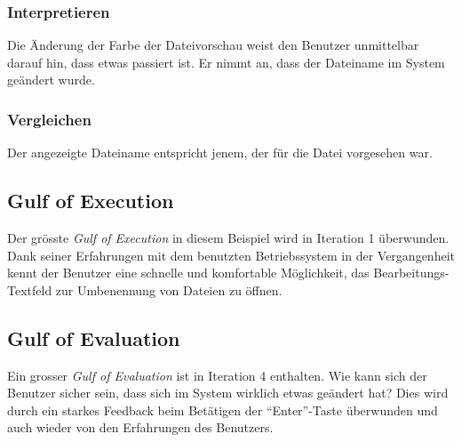 \subsubsection*{Interpretieren}
Die Änderung der Farbe der Dateivorschau weist den Benutzer unmittelbar darauf hin, dass etwas passiert ist. Er nimmt an, dass der Dateiname im System geändert wurde.
\subsubsection*{Vergleichen}
Der angezeigte Dateiname entspricht jenem, der für die Datei vorgesehen war.

\subsection*{Gulf of Execution}
Der grösste \textit{Gulf of Execution} in diesem Beispiel wird in Iteration 1 überwunden. 
Dank seiner Erfahrungen mit dem benutzten Betriebssystem in der Vergangenheit kennt der Benutzer eine schnelle und komfortable Möglichkeit, 
das Bearbeitungs-Textfeld zur Umbenennung von Dateien zu öffnen.

\subsection*{Gulf of Evaluation}
Ein grosser \textit{Gulf of Evaluation} ist in Iteration 4 enthalten. 
Wie kann sich der Benutzer sicher sein, dass sich im System wirklich etwas geändert hat? 
Dies wird durch ein starkes Feedback beim Betätigen der \enquote{Enter}-Taste überwunden und auch wieder von den Erfahrungen des Benutzers.